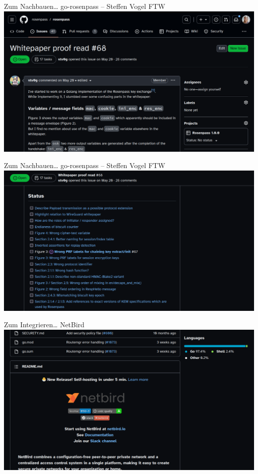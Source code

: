 \documentclass[german]{rosenpass-beamer}
\begin{document}
\begin{frame}{Zum Nachbauen… go-rosenpass – Steffen Vogel FTW}
  \includegraphics[height=.9\textheight]{assets/2023-09-02-steffen-proof-read.png}
\end{frame}

\begin{frame}{Zum Nachbauen… go-rosenpass – Steffen Vogel FTW}
  \includegraphics[height=.9\textheight]{assets/2023-09-02-steffen-proof-read-issues.png}
\end{frame}

\begin{frame}{Zum Integrieren… NetBird}
  \includegraphics[height=.9\textheight]{assets/2023-09-02-netbird-gh.png}
\end{frame}
\end{document}
